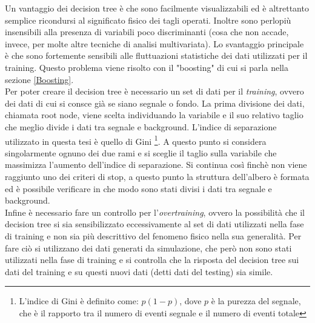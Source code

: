     Un vantaggio dei decision tree è che sono facilmente visualizzabili ed è altrettanto semplice ricondursi al significato fisico dei tagli operati. Inoltre sono perlopiù insensibili alla presenza di variabili poco discriminanti (cosa che non accade, invece, per molte altre tecniche di analisi multivariata). Lo svantaggio principale è che sono fortemente sensibili alle fluttuazioni statistiche dei dati utilizzati per il training. Questo problema viene risolto con il "boosting" di cui si parla nella sezione  \ref{Boosting}.
    \\Per poter creare il decision tree \`e necessario un set di dati per il \textit{training}, ovvero dei dati di cui si consce già se siano segnale o fondo. La prima divisione dei dati, chiamata root node, viene scelta individuando la variabile e il suo relativo taglio che meglio divide i dati tra segnale e background. L'indice di separazione utilizzato in questa tesi è quello di Gini \footnote{L'indice di Gini è definito come: $p (1-p)$, dove $p$ è la purezza del segnale, che è il rapporto tra il numero di eventi segnale e il numero di eventi totale}. A questo punto si considera singolarmente ognuno dei due rami e si sceglie il taglio sulla variabile che massimizza l'aumento dell'indice di separazione. Si continua così finchè non viene raggiunto uno dei criteri di stop,  a questo punto la struttura dell'albero è formata ed è possibile verificare in che modo sono stati divisi i dati tra segnale e background. 
    \\Infine è necessario fare un controllo per l'\textit{overtraining}, ovvero la possibilità che il decision tree si sia sensibilizzato eccessivamente al set di dati utilizzati nella fase di training e non sia più descrittivo del fenomeno fisico nella sua generalità. Per fare ciò si utilizzano dei dati generati da simulazione, che però non sono stati utilizzati nella fase di training e si controlla che la risposta del decision tree sui dati del training e su questi nuovi dati (detti dati del testing) sia simile.\cite{TMVAGuide} 
 
